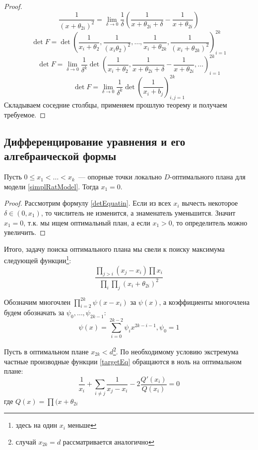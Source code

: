 \begin{proof}
$$ \frac{1}{(x + \theta_{2i})^2} = \lim\limits_{\delta \rightarrow 0} \frac{1}{\delta}\left(\frac{1}{x+\theta_{2i}+\delta} - \frac{1}{x+\theta_{2i}}\right)$$
$$\det F = \det \left(\frac{1}{x_i + \theta_2}, \frac{1}{(x_i \theta_2)^2}, …, \frac{1}{x_i+\theta_{2k}}, \frac{1}{(x_i + \theta_{2k})^2} \right)_{i=1}^{2k}$$
$$ \det F = \lim \limits_{\delta \rightarrow 0} \frac{1}{\delta^k} \det \left(\frac{1}{x_i + \theta_2}, \frac{1}{x+\theta_{2i}+\delta} - \frac{1}{x+\theta_{2i}}, … \right)_{i=1}^{2k}$$
$$\det F = \lim \limits_{\delta \rightarrow 0} \frac{1}{\delta^k}\det \left( \frac{1}{x_i + b_j} \right)_{i,j=1}^{2k}$$
Складываем соседние столбцы, применяем прошлую теорему и получаем требуемое.
\end{proof}

\subsection{Дифференцирование уравнения и его алгебраической формы}

\begin{thm}
Пусть $0 \leq x_1 < … < x_k$ — опорные точки локально $D$-оптимального плана для модели \eqref{simplRatModel}.  Тогда $x_1 = 0$.
\end{thm}
\begin{proof}
Рассмотрим формулу \eqref{detEquatin}. Если из всех $x_i$ вычесть некоторое $\delta \in (0, x_1)$, то числитель не изменится, а знаменатель уменьшится. Значит $x_1 = 0$, т.к. мы ищем оптимальный план, а если $x_1 >0$, то определитель можно увеличить.
\end{proof}

Итого, задачу поиска оптимального плана мы свели к поиску максимума следующей функции\footnote{здесь на один $x_i$ меньше}:
\begin{equation}
\label{targetEq}
\frac{\prod\limits_{j>i}(x_j - x_i) \prod x_i}{\prod\limits_i\prod\limits_j (x_i + \theta_{2i})^2}
\end{equation}

Обозначим многочлен $\prod\limits_{i=2}^{2k}\psi(x-x_i)$ за $\psi(x)$, а коэффициенты многочлена будем обозначать за $\psi_0, …, \psi_{2k-1}$:
$$\psi(x) = \sum\limits_{i=0}^{2k-2}\psi_i x^{2k-i-1}, \psi_0 = 1$$

Пусть в оптимальном плане $x_{2k} < d$\footnote{случай $x_{2k}=d$ рассматривается аналогично}. По необходимому условию экстремума частные производные   функции \eqref{targetEq} обращаются в ноль на оптимальном плане:
$$ \frac{1}{x_i} + \sum\limits_{i\neq j} \frac{1}{x_j- x_i} - 2 \frac{Q'(x_i)}{Q(x_i)} = 0$$
где $Q(x)= \prod(x+\theta_{2i}$ 


